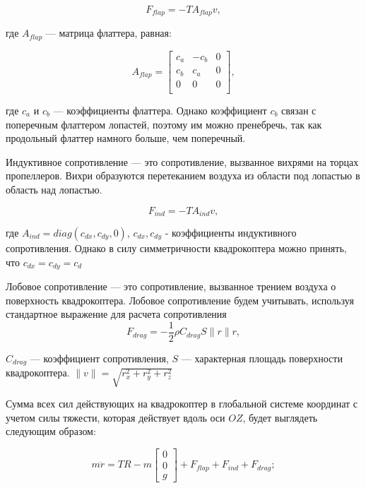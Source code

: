 \begin{equation}
F_{flap} = -T A_{flap} v,
\end{equation}

где \(A_{flap}\) --- матрица флаттера, равная:

\begin{equation}
A_{flap} = \begin{bmatrix}
    c_a & -c_b & 0 \\
    c_b & c_a & 0 \\
    0 & 0 & 0 \\
\end{bmatrix},
\end{equation}

где \(c_a\) и \(c_b\) --- коэффициенты флаттера. Однако коэффициент \(c_b\) связан с поперечным флаттером 
лопастей, поэтому им можно пренебречь, так как продольный флаттер намного больше, чем поперечный. 

Индуктивное сопротивление --- это сопротивление, вызванное вихрями на торцах пропеллеров. Вихри 
образуются перетеканием воздуха из области под лопастью в область над лопастью.

\begin{equation}
F_{ind} = -T A_{ind} v,
\end{equation}

где \(A_{ind}=diag(c_{dx}, c_{dy}, 0)\), \(c_{dx}, c_{dy}\) - коэффициенты индуктивного сопротивления. Однако в силу 
симметричности квадрокоптера можно принять, что \(c_{dx}=c_{dy}=c_{d}\)


Лобовое сопротивление --- это сопротивление, вызванное трением воздуха о поверхность квадрокоптера.
Лобовое сопротивление будем учитывать, используя стандартное выражение для расчета сопротивления
\begin{equation}
F_{drag} = - \frac{1}{2} \rho  C_{drag} S \| r \| r,
\end{equation}

\(C_{drag}\) --- коэффициент сопротивления, \(S\) --- характерная площадь поверхности квадрокоптера.
\(\| v \|= \sqrt{r_x^2 + r_y^2 + r_z^2}\)

Сумма всех сил действующих на квадрокоптер в глобальной системе координат с учетом силы тяжести, которая
действует вдоль оси \(OZ\), будет выглядеть следующим образом:

\begin{equation}
m \ddot{r} =
T R - m \begin{bmatrix} 0 \\ 0 \\ g \end{bmatrix} + F_{flap} + F_{ind} + F_{drag}
;\end{equation}

